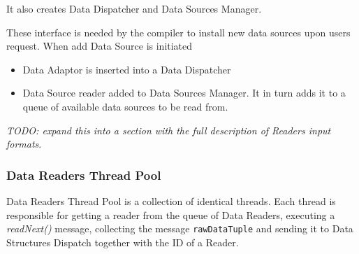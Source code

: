 \documentclass[14pt]{article}
\begin{document}
\noindent It also creates Data Dispatcher and Data Sources Manager.

These interface is needed by the compiler to install new data sources upon users request. When add Data Source is initiated

\begin{itemize}
	\item Data Adaptor is inserted into a Data Dispatcher
	\item Data Source reader added to Data Sources Manager. It in turn adds it to a queue of available data sources to be read from.
\end{itemize}





\noindent \emph{TODO: expand this into a section with the full description of Readers input formats}.




\subsubsection{Data Readers Thread Pool}

Data Readers Thread Pool is a collection of identical threads. Each thread is responsible for getting a reader from the queue of Data Readers, executing a \emph{readNext()} message, collecting the message {\tt rawDataTuple} and sending it to Data Structures Dispatch together with the ID of a Reader.
\end{document}
